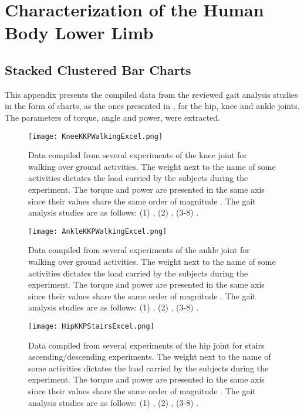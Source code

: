 
\chapter{Characterization of the Human Body Lower Limb} \label{appendixA}
\section{Stacked Clustered Bar Charts}
This appendix presents the compiled data from the reviewed gait analysis studies in the form of charts, as the ones presented in , for the hip, knee and ankle joints. The parameters of torque, angle and power, were extracted.

\begin{figure}[htbp]
\centering
    \texttt{[image: KneeKKPWalkingExcel.png]}
    \caption{Data compiled from several experiments of the knee joint for walking over ground activities. The weight next to the name of some activities dictates the load carried by the subjects during the experiment. The torque and power are presented in the same axis since their values share the  same order of magnitude \cite{solis2017characterization}. The gait analysis studies are as follows: (1) \cite{bovi2011multiple}, (2) \cite{lee2008biomechanics}, (3-8) \cite{han2011biomechanical}.}
    \label{fig:kneeKKPWalking}
\end{figure}

\begin{figure}[htbp]
\centering
    \texttt{[image: AnkleKKPWalkingExcel.png]}
    \caption{Data compiled from several experiments of the ankle joint for walking over ground activities. The weight next to the name of some activities dictates the load carried by the subjects during the experiment. The torque and power are presented in the same axis since their values share the  same order of magnitude \cite{solis2017characterization}. The gait analysis studies are as follows: (1) \cite{bovi2011multiple}, (2) \cite{lee2008biomechanics}, (3-8) \cite{han2011biomechanical}.}
    \label{fig:ankleKKPWalking}
\end{figure}

\begin{figure}[htbp]
    \centering
    \texttt{[image: HipKKPStairsExcel.png]}
    \caption{Data compiled from several experiments of the hip joint for stairs ascending/descending experiments. The weight next to the name of some activities dictates the load carried by the subjects during the experiment. The torque and power are presented in the same axis since their values share the  same order of magnitude \cite{solis2017characterization}. The gait analysis studies are as follows: (1) \cite{bovi2011multiple}, (2) \cite{lee2008biomechanics}, (3-8) \cite{han2011biomechanical}. }
    \label{fig:hipKKPStairs}
\end{figure}

